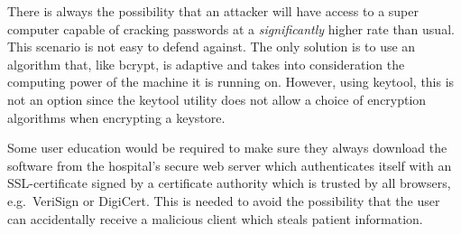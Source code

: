 \documentclass[10pt, a4paper]{article}
\begin{document}
There is always the possibility that an attacker will have access to a super computer capable of cracking passwords at a \emph{significantly} higher rate than usual. This scenario is not easy to defend against. The only solution is to use an algorithm that, like bcrypt, is adaptive and takes into consideration the computing power of the machine it is running on. However, using keytool, this is not an option since the keytool utility does not allow a choice of encryption algorithms when encrypting a keystore.


Some user education would be required to make sure they always download the software from the hospital's secure web server which authenticates itself with an SSL-certificate signed by a certificate authority which is trusted by all browsers, e.g.~VeriSign or DigiCert. This is needed to avoid the possibility that the user can accidentally receive a malicious client which steals patient information.
\end{document}
